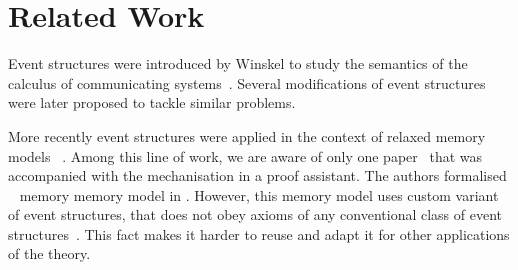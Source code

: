 \section{Related Work}


Event structures were introduced by Winskel to study the semantics of 
the calculus of communicating systems~\cite{Winskel:82}. 
Several modifications of event structures~\cite{Langerak:91, Boudol-Castellani:1991}
were later proposed to tackle similar problems.  
 
More recently event structures were applied 
in the context of relaxed memory models~%
\cite{Jeffrey-Riely:LICS16, PichonPharabod-Sewell:POPL16, Chakraborty-Vafeiadis:POPL19, Moiseenko-al:ECOOP20}.
Among this line of work, we are aware of only one paper~\cite{Moiseenko-al:ECOOP20}
that was accompanied with the mechanisation in a proof assistant. 
The authors formalised \weakestmo~\cite{Chakraborty-Vafeiadis:POPL19} 
memory memory model in \coq. However, this memory model uses 
custom variant of event structures, that does not 
obey axioms of any conventional class of 
event structures~\cite{Winskel:82, Langerak:91, Boudol-Castellani:1991}. 
This fact makes it harder to reuse and adapt it 
for other applications of the theory. 

